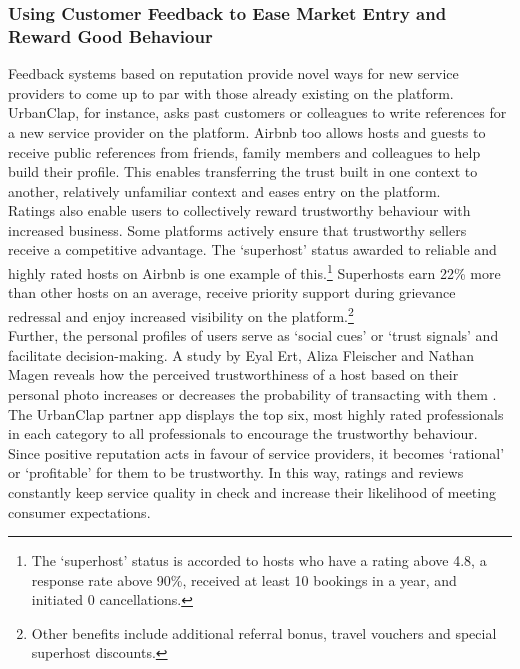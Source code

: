 \documentclass[a4paper, 12pt]{article}
\begin{document}
	\subsubsection{Using Customer Feedback to Ease Market Entry and Reward Good Behaviour}
                    
 Feedback systems based on reputation provide novel ways for new service providers to come up to par with those already existing on the platform. UrbanClap, for instance, asks past customers or colleagues to write references for a new service provider on the platform. Airbnb too allows hosts and guests to receive public references from friends, family members and colleagues to help build their profile. This enables transferring the trust built in one context to another, relatively unfamiliar context and eases entry on the platform.\\
                    
                 Ratings also enable users to collectively reward trustworthy behaviour with increased business. Some platforms actively ensure that trustworthy sellers receive a competitive advantage. The ‘superhost’ status awarded to reliable and highly rated hosts on Airbnb is one example of this.\footnote{The ‘superhost’ status is accorded to hosts who have a rating above 4.8, a response rate above 90\%, received at least 10 bookings in a year, and initiated 0 cancellations.} Superhosts earn 22\% more than other hosts on an average, receive priority support during grievance redressal and enjoy increased visibility on the platform.\footnote{Other benefits include additional referral bonus, travel vouchers and special superhost discounts.}   \\

Further, the personal profiles of users serve as ‘social cues’ or ‘trust signals’ and facilitate decision-making. A study by Eyal Ert, Aliza Fleischer and Nathan Magen reveals how the perceived trustworthiness of a host based on their personal photo increases or decreases the probability of transacting with them \parencite{ert2016trust}.\\

The UrbanClap partner app displays the top six, most highly rated professionals in each category to all professionals to encourage the trustworthy behaviour. \\

Since positive reputation acts in favour of service providers, it becomes ‘rational’ or ‘profitable’ for them to be trustworthy. In this way, ratings and reviews constantly keep service quality in check and increase their likelihood of meeting consumer expectations.\\
\end{document}
